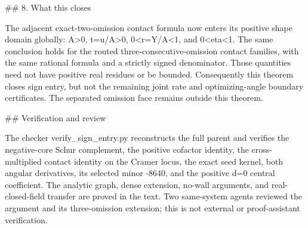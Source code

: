 ## 8. What this closes

The adjacent exact-two-omission contact formula now enters its positive
shape domain globally: A>0, t=u/A>0, 0<r=Y/A<1, and 0<eta<1.
The same conclusion holds for the routed three-consecutive-omission contact
families, with the same rational formula and a strictly signed denominator.
Those quantities need not have positive real residues or be bounded.
Consequently this theorem closes sign entry, but not the remaining joint
rate and optimizing-angle boundary certificates. The separated omission
face remains outside this theorem.

## Verification and review

The checker verify_sign_entry.py reconstructs the full parent and verifies
the negative-core Schur complement, the positive cofactor identity, the
cross-multiplied contact identity on the Cramer locus, the exact seed kernel,
both angular derivatives, its selected minor -8640, and the positive d=0
central coefficient. The analytic graph, dense extension, no-wall arguments,
and real-closed-field transfer are proved in the text. Two same-system
agents reviewed the argument and its three-omission extension; this is not
external or proof-assistant verification.
